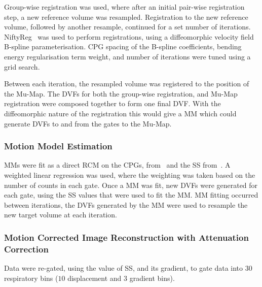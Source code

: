                 Group-wise registration was used, where after an initial pair-wise registration step, a new reference volume was resampled. Registration to the new reference volume, followed by another resample, continued for a set number of iterations. NiftyReg~\parencite{Modat2010} was used to perform registrations, using a diffeomorphic velocity field B-spline parameterisation. \gls{CPG} spacing of the B-spline coefficients, bending energy regularisation term weight, and number of iterations were tuned using a grid search.
                
                Between each iteration, the resampled volume was registered to the position of the \gls{Mu-Map}. The \glspl{DVF} for both the group-wise registration, and \gls{Mu-Map} registration were composed together to form one final \gls{DVF}. With the diffeomorphic nature of the registration this would give a \gls{MM} which could generate \glspl{DVF} to and from the gates to the \gls{Mu-Map}.
            
            \subsubsection{Motion Model Estimation} \label{sec:pet_ct_motion_correction_exploiting_motion_models_fit_on_coarsely_gated_data_applied_to_finely_gated_data_methods_motion_model_estimation}
                \glspl{MM} were fit as a direct \gls{RCM} on the \glspl{CPG}, from~ and the \gls{SS} from~. A weighted linear regression was used, where the weighting was taken based on the number of counts in each gate. Once a \gls{MM} was fit, new \glspl{DVF} were generated for each gate, using the \gls{SS} values that were used to fit the \gls{MM}. \gls{MM} fitting occurred between iterations, the \glspl{DVF} generated by the \gls{MM} were used to resample the new target volume at each iteration.
            
            \subsubsection{Motion Corrected Image Reconstruction with Attenuation Correction} \label{sec:pet_ct_motion_correction_exploiting_motion_models_fit_on_coarsely_gated_data_applied_to_finely_gated_data_methods_mc_image_reconstruction_with_ac}
                Data were re-gated, using the value of \gls{SS}, and its gradient, to gate data into $30$ respiratory bins ($10$ displacement and $3$ gradient bins).
                
